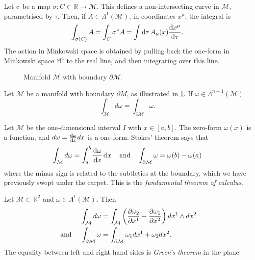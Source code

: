 \begin{example}[]
  Let $\sigma$ be a map $\sigma \colon C \subset \mathbb{R} \to \mathcal{M}$. This defines a non-intersecting curve in $\mathcal{M}$, parametrised by $\tau$. Then, if $A \in \Lambda^1(\mathcal{M})$, in coordinates $x^\mu$, the integral is
  \begin{equation}
    \int_{\sigma(C)} A = \int_{C}\sigma^* A = \int \dd{\tau} A_\mu (x) \dv{x^\mu}{\tau}.
  \end{equation}
  The action in Minkowski space is obtained by pulling back the one-form in Minkowski space $\mathbb{M}^4$ to the real line, and then integrating over this line.
\end{example}

\begin{figure}[tbhp]
  \centering
  \def\svgwidth{0.5\columnwidth}
  
  \caption{Manifold $\mathcal{M}$ with boundary $\partial \mathcal{M}$.}
  \label{fig:mfdwboundary}
\end{figure}

\begin{theorem}
  Let $\mathcal{M}$ be a manifold with boundary $\partial M$, as illustrated in \ref{fig:mfdwboundary}.
  If $\omega \in \Lambda^{n-1}(\mathcal{M})$
  \begin{equation}
    \int_{\mathcal{M}} d\omega = \int_{\partial \mathcal{M}} \omega.
  \end{equation}
\end{theorem}

\begin{example}[]
  Let $\mathcal{M}$ be the one-dimensional interval $I$ with $x \in [a, b]$. The zero-form $\omega(x)$ is a function, and $d\omega = \dv{\omega}{x} dx$ is a one-form.
  Stokes' theorem says that
  \begin{equation}
    \int_{\mathcal{M}} d\omega = \int_{a}^{b} \dv{\omega}{x} \dd[]{x} \quad \text{and} \quad 
    \int_{\partial \mathcal{M}} \omega = \omega(b) - \omega(a)
  \end{equation}
  where the minus sign is related to the subtleties at the boundary, which we have previously swept under the carpet.
  This is the \emph{fundamental theorem of calculus}.
\end{example}

\begin{example}[]
  Let $\mathcal{M} \subset \mathbb{R}^2$ and $\omega \in \Lambda^1(\mathcal{M})$. Then
  \begin{align}
    \int_{\mathcal{M}} d\omega &= \int_{\mathcal{M}} \left( \pdv{\omega_2}{x^1} - \pdv{\omega_1}{x^2} \right) dx^1 \wedge dx^2 \\
    \text{ and } \quad \int_{\partial \mathcal{M}} \omega &= \int_{\partial \mathcal{M}} \omega_1 dx^1 + \omega_2 dx^2.
  \end{align}
  The equality between left and right hand sides is \emph{Green's theorem} in the plane.
\end{example}

